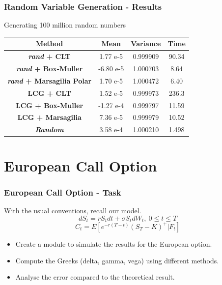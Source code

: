 \documentclass[12pt]{beamer}
\begin{document}
\begin{frame}
\frametitle{Random Variable Generation - Results}
Generating 100 million random numbers
\begin{center}
\begin{tabular}{| c| c| c| c| }
\hline
\textbf{ Method} &\textbf{ Mean} & \textbf{Variance}&\textbf{ Time} \\ \hline
\textbf{\textit{ rand}  + CLT} & 1.77 e-5 & 0.999909 & 90.34 \\  \hline
\textbf{\textit{ rand}  + Box-Muller} & -6.80 e-5 & 1.000703&8.64\\ \hline
\textbf{\textit{ rand}  + Marsagilia Polar} & 1.70 e-5& 1.000472& 6.40\\ \hline
\textbf{ LCG + CLT} & 1.52 e-5& 0.999973&236.3\\ \hline
\textbf{LCG + Box-Muller} & -1.27 e-4 & 0.999797&11.59\\ \hline
\textbf{ LCG + Marsagilia} & 7.36 e-5 & 0.999979&10.52\\ \hline
\textbf{\textit{Random} }& 3.58 e-4 & 1.000210&1.498\\ \hline

\end{tabular}
\end{center}

\end{frame}



\section{European Call Option}
\begin{frame}
\frametitle{European Call Option - Task}

With the usual conventions, recall our model.
$$dS_t=rS_tdt+\sigma S_tdW_t, \ 0\leq t \leq T$$
$$C_t = E[e^{-r(T-t)}(S_T-K)^+|\textit{F}_t]$$

\begin{itemize}
  \item Create a module to simulate the results for the European option.
  \item Compute the Greeks (delta, gamma, vega) using different methods.
  \item Analyse the error compared to the theoretical result.
\end{itemize}
\end{frame}
\end{document}
